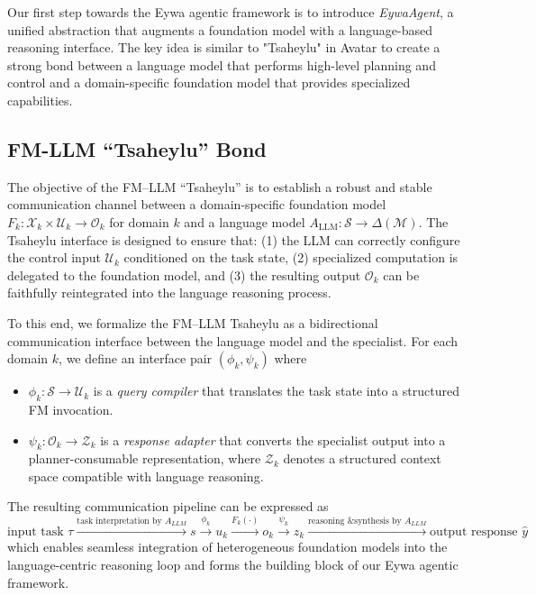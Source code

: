\documentclass{llmxive}
\begin{document}
{Our first step towards the Eywa agentic framework is to introduce \textit{EywaAgent}, a unified abstraction that augments a foundation model with a language-based reasoning interface. The key idea is similar to "Tsaheylu" in Avatar to create a strong bond between a language model that performs high-level planning and control and a domain-specific foundation model that provides specialized capabilities. 

\subsection{FM-LLM ``Tsaheylu'' Bond}

The objective of the FM--LLM ``Tsaheylu'' is to establish a robust and stable communication channel between a domain-specific foundation model $F_k : \mathcal{X}_k \times \mathcal{U}_k \to \mathcal{O}_k$ for domain $k$ and a language model $A_{\mathrm{LLM}} : \mathcal{S} \to \Delta(\mathcal{M})$. The Tsaheylu interface is designed to ensure that: (1) the LLM can correctly configure the control input $\mathcal{U}_k$ conditioned on the task state, (2) specialized computation is delegated to the foundation model, and (3) the resulting output $\mathcal{O}_k$ can be faithfully reintegrated into the language reasoning process.

To this end, we formalize the FM--LLM Tsaheylu as a bidirectional communication interface between the language model and the specialist. For each domain $k$, we define an interface pair $(\phi_k, \psi_k)$ where

\begin{itemize}
    \item $\phi_k : \mathcal{S} \to \mathcal{U}_k$ is a \emph{query compiler} that translates the task state into a structured FM invocation.
    \item $\psi_k : \mathcal{O}_k \to \mathcal{Z}_k$ is a \emph{response adapter} that converts the specialist output into a planner-consumable representation, where $\mathcal{Z}_k$ denotes a structured context space compatible with language reasoning.
\end{itemize} 

The resulting communication pipeline can be expressed as
\[
\text{input task} \,\, \tau 
\xrightarrow{\text{task interpretation by} \,\, A_{LLM}} 
s
\xrightarrow{\phi_k} 
u_k 
\xrightarrow{F_k(\cdot)} 
o_k 
\xrightarrow{\psi_k} 
z_k 
\xrightarrow{\text{reasoning \& synthesis by} \,\, A_{LLM}} 
\text{output response} \,\, \hat{y}
\]
which enables seamless integration of heterogeneous foundation models into the language-centric reasoning loop and forms the building block of our Eywa agentic framework.

}
\end{document}
